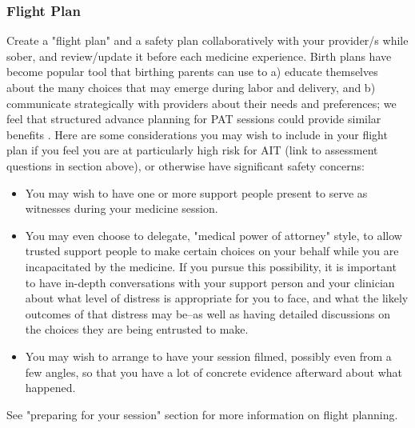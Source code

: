 \documentclass[12pt,letterpaper]{book}
\begin{document}
\subsubsection*{Flight Plan}
Create a "flight plan" and a safety plan collaboratively with your provider/s while sober, and review/update it before each medicine experience. Birth plans have become popular tool that birthing parents can use to a) educate themselves about the many choices that may emerge during labor and delivery, and b) communicate strategically with providers about their needs and preferences; we feel that structured advance planning for PAT sessions could provide similar benefits \cite{birthPlan}. Here are some considerations you may wish to include in your flight plan if you feel you are at particularly high risk for AIT (link to assessment questions in section above), or otherwise have significant safety concerns:
\begin{itemize}
    \item You may wish to have one or more support people present to serve as witnesses during your medicine session. 
    \item You may even choose to delegate, "medical power of attorney" style, to allow trusted support people to make certain choices on your behalf while you are incapacitated by the medicine. If you pursue this possibility, it is important to have in-depth conversations with your support person and your clinician about what level of distress is appropriate for you to face, and what the likely outcomes of that distress may be–as well as having detailed discussions on the choices they are being entrusted to make. 
    \item You may wish to arrange to have your session filmed, possibly even from a few angles, so that you have a lot of concrete evidence afterward about what happened.
\end{itemize}
See "preparing for your session" section for more information on flight planning. 
\end{document}
